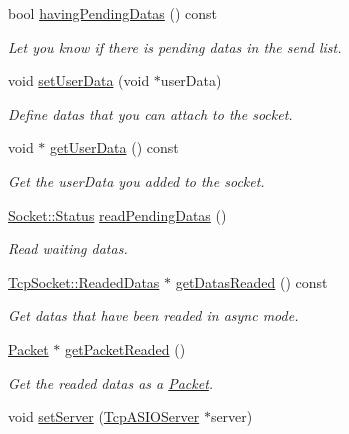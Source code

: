 \begin{DoxyCompactItemize}
bool \hyperlink{classmognetwork_1_1_tcp_socket_aff17b683f622b017876751d9cbbad3bb}{having\-Pending\-Datas} () const 
\begin{DoxyCompactList}\small\item\em Let you know if there is pending datas in the send list. \end{DoxyCompactList}\item 
void \hyperlink{classmognetwork_1_1_tcp_socket_a2d7327be349e705c74bdc6b40c1b2520}{set\-User\-Data} (void $\ast$user\-Data)
\begin{DoxyCompactList}\small\item\em Define datas that you can attach to the socket. \end{DoxyCompactList}\item 
void $\ast$ \hyperlink{classmognetwork_1_1_tcp_socket_adef63a929423324fd75888e2195176e0}{get\-User\-Data} () const 
\begin{DoxyCompactList}\small\item\em Get the user\-Data you added to the socket. \end{DoxyCompactList}\item 
\hyperlink{classmognetwork_1_1_socket_aa187a8394ac0d6203af0ec7f021ca15f}{Socket\-::\-Status} \hyperlink{classmognetwork_1_1_tcp_socket_af3918374ee41223b77f669367d4b0e22}{read\-Pending\-Datas} ()
\begin{DoxyCompactList}\small\item\em Read waiting datas. \end{DoxyCompactList}\item 
\hyperlink{structmognetwork_1_1_tcp_socket_1_1_readed_datas}{Tcp\-Socket\-::\-Readed\-Datas} $\ast$ \hyperlink{classmognetwork_1_1_tcp_socket_a6dbe149a276fb24203267762fbd1c276}{get\-Datas\-Readed} () const 
\begin{DoxyCompactList}\small\item\em Get datas that have been readed in async mode. \end{DoxyCompactList}\item 
\hyperlink{classmognetwork_1_1_packet}{Packet} $\ast$ \hyperlink{classmognetwork_1_1_tcp_socket_ac8619a5f869abfda7b8c2d32c94870f3}{get\-Packet\-Readed} ()
\begin{DoxyCompactList}\small\item\em Get the readed datas as a \hyperlink{classmognetwork_1_1_packet}{Packet}. \end{DoxyCompactList}\item 
void \hyperlink{classmognetwork_1_1_tcp_socket_ae35e2fd8fbf6f9d3bdb87650b3bedff1}{set\-Server} (\hyperlink{classmognetwork_1_1_tcp_a_s_i_o_server}{Tcp\-A\-S\-I\-O\-Server} $\ast$server)

\end{DoxyCompactItemize}

